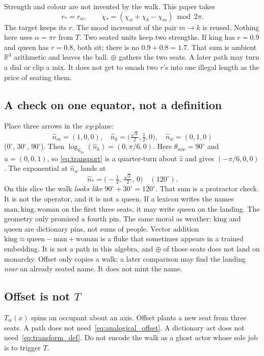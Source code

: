 \documentclass[12pt, a4paper]{article}
\begin{document}
Strength and colour are not invented by the walk. This paper takes
\begin{equation}
    r_{*}=r_w,
    \qquad
    \chi_{*}=(\chi_w+\chi_k-\chi_m)\bmod 2\pi.
    \label{eq:offset_rchi}
\end{equation}
The target keeps its $r$. The mood increment of the pair $m\to k$
is reused. Nothing here uses $\alpha=\pi r$ from $T$.
Two seated units keep two strengths. If $\mathrm{king}$ has $r=0.9$
and $\mathrm{queen}$ has $r=0.8$, both sit; there is no
$0.9+0.8=1.7$. That sum is ambient $\mathbb{R}^3$ arithmetic and
leaves the ball. $\oplus$ gathers the two seats. A later path may
turn a dial or clip a mix. It does not get to smash two $r$'s into
one illegal length as the price of seating them.

\subsection{A check on one equator, not a definition}
\label{subsec:offset_equator}
Place three arrows in the $xy$-plane:
\[
\hat n_m=(1,0,0),\quad
\hat n_k=\bigl(\tfrac{\sqrt{3}}{2},\tfrac12,0\bigr),\quad
\hat n_w=(0,1,0)
\]
($0^\circ$, $30^\circ$, $90^\circ$). Then
$\log_{\hat n_m}(\hat n_k)=(0,\pi/6,0)$.
Here $\theta_{mw}=90^\circ$ and $\hat u=(0,0,1)$, so
\eqref{eq:transport} is a quarter-turn about $\hat z$ and gives
$(-\pi/6,0,0)$. The exponential at
$\hat n_w$ lands at
\[
\hat n_{*}=\bigl(-\tfrac12,\,\tfrac{\sqrt{3}}{2},\,0\bigr)
\quad (120^\circ).
\]
On this slice the walk \emph{looks like} $90^\circ+30^\circ=120^\circ$.
That sum is a protractor check. It is not the operator, and it is
not a queen. If a lexicon writes the names
$\mathrm{man},\mathrm{king},\mathrm{woman}$ on the first three seats,
it may write $\mathrm{queen}$ on the landing. The geometry only
promised a fourth pin.
The same moral as weather: $\mathrm{king}$ and $\mathrm{queen}$
are dictionary pins, not sums of people. Vector addition
$\mathrm{king}\approx\mathrm{queen}-\mathrm{man}+\mathrm{woman}$
is a fluke that sometimes appears in a trained embedding. It is
not a path in this algebra, and $\oplus$ of those seats does not
land on monarchy. Offset only copies a walk; a later comparison
may find the landing \emph{near} an already seated name. It does
not mint the name.

\subsection{Offset is not $T$}
\label{subsec:offset_not_T}
$T_w(x)$ spins an occupant about an axis. Offset plants a new seat
from three seats. A path does not need~\eqref{eq:analogical_offset}.
A dictionary act does not need~\eqref{eq:transform_def}. Do not
encode the walk as a ghost actor whose sole job is to trigger $T$.
\end{document}
